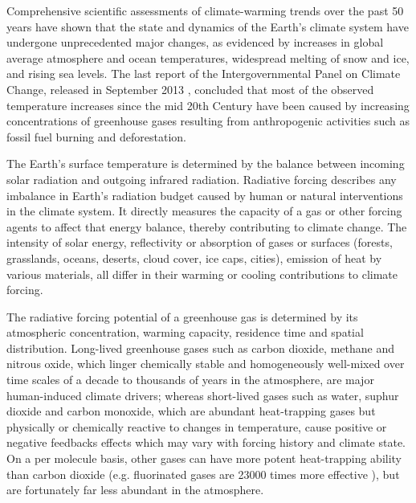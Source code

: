 Comprehensive  scientific assessments  of climate-warming  trends over
the  past 50  years have  shown  that the  state and  dynamics of  the
Earth's climate system have  undergone unprecedented major changes, as
evidenced  by  increases  in   global  average  atmosphere  and  ocean
temperatures,  widespread melting  of  snow and  ice,  and rising  sea
levels.   The last report  of the  Intergovernmental Panel  on Climate
Change, released  in September 2013  \citep{IPCC-2013}, concluded that
most of the observed temperature  increases since the mid 20th Century
have  been caused  by  increasing concentrations  of greenhouse  gases
resulting from  anthropogenic activities  such as fossil  fuel burning
and  deforestation.

The Earth's  surface temperature is determined by  the balance between
incoming  solar radiation and  outgoing infrared  radiation. Radiative
forcing describes any imbalance  in Earth’s radiation budget caused by
human  or natural interventions  in the  climate system.   It directly
measures the capacity of a gas  or other forcing agents to affect that
energy balance, thereby contributing to climate change.  The intensity
of  solar energy,  reflectivity  or absorption  of  gases or  surfaces
(forests, grasslands, oceans, deserts, cloud cover, ice caps, cities),
emission of heat by various  materials, all differ in their warming or
cooling contributions to climate forcing.

The radiative forcing  potential of a greenhouse gas  is determined by
its  atmospheric concentration, warming  capacity, residence  time and
spatial  distribution.   Long-lived greenhouse  gases  such as  carbon
dioxide, methane and nitrous oxide, which linger chemically stable and
homogeneously well-mixed over time scales  of a decade to thousands of
years  in the  atmosphere,  are major  human-induced climate  drivers;
whereas  short-lived gases such  as water,  suphur dioxide  and carbon
monoxide,  which are  abundant heat-trapping  gases but  physically or
chemically  reactive  to changes  in  temperature,  cause positive  or
negative  feedbacks effects which  may vary  with forcing  history and
climate  state. On a  per molecule  basis, other  gases can  have more
potent  heat-trapping ability  than carbon  dioxide  (e.g. fluorinated
gases  are 23000  times more  effective \citep{Zehner-2012}),  but are
fortunately far less abundant in the atmosphere.

